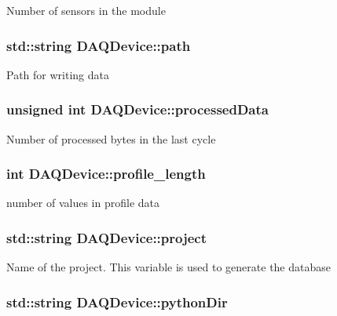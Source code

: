 Number of sensors in the module \hypertarget{classDAQDevice_a388a037825fdd2248eb1cadf15780bcd}{
\subsubsection[{path}]{\setlength{\rightskip}{0pt plus 5cm}std\-::string D\-A\-Q\-Device\-::path\hspace{0.3cm}{\ttfamily [protected]}}}\label{classDAQDevice_a388a037825fdd2248eb1cadf15780bcd}
Path for writing data \hypertarget{classDAQDevice_a4ba9ed1e61cf39c3e3eab37e8cfc908c}{
\subsubsection[{processed\-Data}]{\setlength{\rightskip}{0pt plus 5cm}unsigned int D\-A\-Q\-Device\-::processed\-Data\hspace{0.3cm}{\ttfamily [protected]}}}\label{classDAQDevice_a4ba9ed1e61cf39c3e3eab37e8cfc908c}
Number of processed bytes in the last cycle \hypertarget{classDAQDevice_a5da19e281fb55786ad815c0d98a0c616}{
\subsubsection[{profile\-\_\-length}]{\setlength{\rightskip}{0pt plus 5cm}int D\-A\-Q\-Device\-::profile\-\_\-length\hspace{0.3cm}{\ttfamily [protected]}}}\label{classDAQDevice_a5da19e281fb55786ad815c0d98a0c616}
number of values in profile data \hypertarget{classDAQDevice_a2febc34bb56a8b39d0d13523ccc60c3e}{
\subsubsection[{project}]{\setlength{\rightskip}{0pt plus 5cm}std\-::string D\-A\-Q\-Device\-::project\hspace{0.3cm}{\ttfamily [protected]}}}\label{classDAQDevice_a2febc34bb56a8b39d0d13523ccc60c3e}
Name of the project. This variable is used to generate the database \hypertarget{classDAQDevice_a4d916c2296ae785dbe02859721b410e6}{
\subsubsection[{python\-Dir}]{\setlength{\rightskip}{0pt plus 5cm}std\-::string D\-A\-Q\-Device\-::python\-Dir\hspace{0.3cm}{\ttfamily [protected]}}}\label{classDAQDevice_a4d916c2296ae785dbe02859721b410e6}
